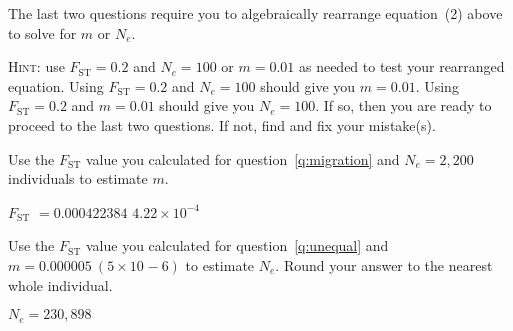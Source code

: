 \documentclass[12pt, addpoints, hidelinks]{exam}
\newcommand{\fst}{$F_{\mathrm{ST}}$}
\begin{document}
\begin{questions}
The last two questions require you to algebraically rearrange equation~(2) above to solve for $m$ or $N_e$.

\textsc{Hint:} use $F_\mathrm{ST} = 0.2$ and $N_e = 100$ or $m = 0.01$ as needed to test your rearranged equation. Using $F_\mathrm{ST} = 0.2$ and $N_e = 100$ should give you $m = 0.01$. Using $F_\mathrm{ST} = 0.2$ and $m = 0.01$ should give you $N_e = 100$. If so, then you are ready to proceed to the last two questions. If not, find and fix your mistake(s).

\question[4]
Use the \fst{} value you calculated for question~\ref{q:migration} and $N_e = 2,200$ individuals to estimate $m$. 

\ifprintanswers 
	\fst{} $= 0.000422384$ \quad $4.22 \times 10^{-4}$
	
	\vspace{2\baselineskip} 
\else 
	\vspace{2\baselineskip}
\fi

\question[4]
Use the \fst{} value you calculated for question~\ref{q:unequal} and $m = 0.000005\ (5\times 10^{}-6)$ to estimate $N_e$. Round your answer to the nearest whole individual.

\ifprintanswers 
	$N_e = 230,898$\newline
	\vspace{\baselineskip}
\else 
	\vspace{2\baselineskip} 
\fi

\end{questions}
\end{document}
